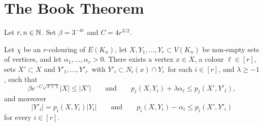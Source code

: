 \section{The Book Theorem}


\begin{lemma}
  \label{lem:key-lemma}

  Let $r, n\in\mathbb{N}$. Set $\beta = 3^{-4r}$ and $C = 4r^{3/2}$.

  Let\/ $\chi$ be an\/ $r$-colouring of\/ $E(K_n)$, let\/ $X,Y_1,\ldots,Y_r \subset V(K_n)$ be non-empty sets of vertices, and let $\alpha_1,\ldots,\alpha_r > 0$. There exists a vertex $x \in X$, a colour $\ell \in [r]$, sets $X' \subset X$ and\/ $Y'_1,\ldots,Y'_r\,$ with\/ $Y'_i \subset N_i(x) \cap Y_i\,$ for each $i \in [r]$, and\/ $\lambda \ge -1$, such that
  \begin{equation}\label{eq:key:ell}
    \beta e^{- C \sqrt{\lambda + 1}} |X| \le |X'| \qquad \text{and} \qquad p_\ell(X,Y_\ell) + \lambda \alpha_\ell \le p_\ell( X', Y'_\ell ) ,
  \end{equation}
  and moreover
  \begin{equation}\label{eq:key:alli}
    |Y'_i| = p_i(X,Y_i) |Y_i| \qquad \text{and} \qquad  p_i(X,Y_i) - \alpha_i \le p_i( X', Y'_i )
  \end{equation}
  for every $i \in [r]$.
\end{lemma}

